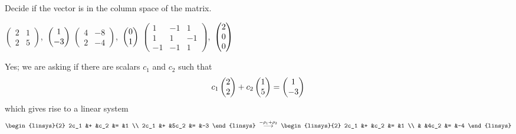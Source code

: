 \begin{exercises}
  \recommended \item  
    Decide if the vector is in the column space of the matrix.
    \begin{exparts*}
      \partsitem \( \begin{pmatrix}
                   2  &1  \\
                   2  &5
                 \end{pmatrix} \),~\( \begin{pmatrix} 1 \\ -3 \end{pmatrix}  \)
      \partsitem \( \begin{pmatrix}
                   4  &-8 \\
                   2  &-4
                 \end{pmatrix} \),~\( \begin{pmatrix} 0 \\ 1 \end{pmatrix}  \)
      \partsitem \( \begin{pmatrix}
                   1  &-1  &1  \\
                   1  &1   &-1 \\
                  -1  &-1  &1
                \end{pmatrix} \),~\( \begin{pmatrix} 2 \\ 0 \\ 0 \end{pmatrix}  \)
    \end{exparts*}
    \begin{answer}
      \begin{exparts}
        \partsitem Yes;
          we are asking if there are scalars \( c_1 \) and \( c_2 \) such that
          \begin{equation*}
            c_1\begin{pmatrix} 2 \\ 2 \end{pmatrix}+c_2\begin{pmatrix} 1 \\ 5 \end{pmatrix}=\begin{pmatrix} 1 \\ -3 \end{pmatrix}
          \end{equation*}
          which gives rise to a linear system
          \begin{equation*}
            \begin{linsys}{2}
              2c_1  &+  &c_2  &=  &1  \\
              2c_1  &+  &5c_2 &=  &-3
            \end{linsys}
            \;\grstep{-\rho_1+\rho_2}\;
            \begin{linsys}{2}
              2c_1  &+  &c_2  &=  &1  \\
                    &   &4c_2 &=  &-4
            \end{linsys}
          \end{equation*}

\end{exparts}
\end{answer}
\end{exercises}
